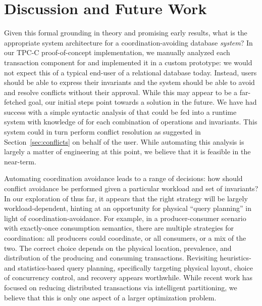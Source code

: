 
\section{Discussion and Future Work}
\label{sec:discussion}


 Given this formal grounding in theory
and promising early results, what is the appropriate system
architecture for a coordination-avoiding database \textit{system}? In
our TPC-C proof-of-concept implementation, we manually analyzed each
transaction component for \iconfluence and implemented it in a custom
prototype: we would not expect this of a typical end-user of a
relational database today. Instead, users should be able to express
their invariants and the system should be able to avoid and resolve
conflicts without their approval. While this may appear to be a
far-fetched goal, our initial steps point towards a solution in the
future. We have had success with a simple syntactic analysis of \lang
that could be fed into a runtime system with knowledge of \iconfluence
for each combination of operations and invariants. This system could
in turn perform conflict resolution as suggested in
Section~\ref{sec:conflicts} on behalf of the user. While automating
this analysis is largely a matter of engineering at this point, we
believe that it is feasible in the near-term.

 Automating coordination
avoidance leads to a range of decisions: how should conflict avoidance
be performed given a particular workload and set of invariants? In our
exploration of \iconfluence thus far, it appears that the right
strategy will be largely workload-dependent, hinting at an opportunity
for physical ``query planning'' in light of
coordination-avoidance. For example, in a producer-consumer scenario
with exactly-once consumption semantics, there are multiple strategies
for coordination: all producers could coordinate, or all consumers, or
a mix of the two. The correct choice depends on the physical location,
prevalence, and distribution of the producing and consuming
transactions. Revisiting heuristics- and statistics-based query
planning, specifically targeting physical layout, choice of
concurrency control, and recovery appears worthwhile. While recent
work has focused on reducing distributed transactions via intelligent
partitioning, we believe that this is only one aspect of a larger
optimization problem.

